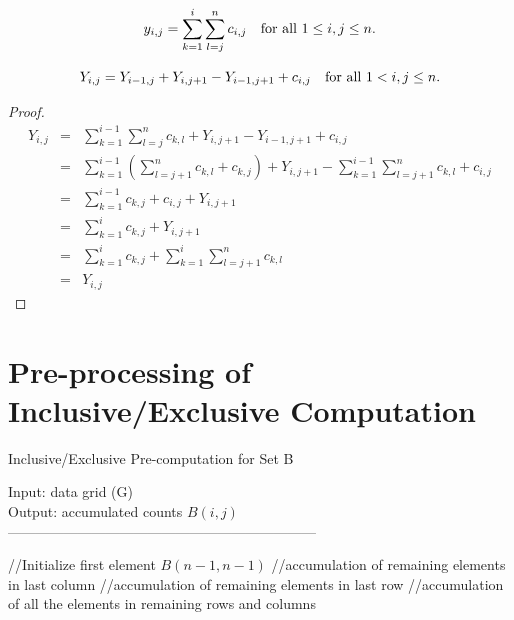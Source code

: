 \documentclass[AMA,LATO1COL]{WileyNJD-v2}
\begin{document}
\begin{definition}
\begin{equation}
y_{i,j}=\sum_{k=1}^{i}\sum_{l=j}^{n}c_{i,j}\mbox{\quad for all $1\leq i,j\leq n$}.
\end{equation}
\end{definition}

\begin{lemma}
\begin{equation}
Y_{i,j}=Y_{i-1,j}+Y_{i,j+1}-Y_{i-1,j+1}+c_{i,j} \mbox{\quad for all $1<i,j\leq n$}.
\end{equation}
\end{lemma}

\begin{proof}
\begin{eqnarray*}
Y_{i,j}& = & \sum_{k=1}^{i-1}\sum_{l=j}^{n}c_{k,l}+Y_{i,j+1}-Y_{i-1,j+1}+c_{i,j}\\
 & = & \sum_{k=1}^{i-1}\left(\sum_{l=j+1}^{n}c_{k,l}+c_{k,j}\right)+Y_{i,j+1}-\sum_{k=1}^{i-1}\sum_{l=j+1}^{n}c_{k,l}+c_{i,j}\\
 & = & \sum_{k=1}^{i-1}c_{k,j}+c_{i,j}+Y_{i,j+1}\\
 & = & \sum_{k=1}^{i}c_{k,j}+Y_{i,j+1}\\
 & = & \sum_{k=1}^{i}c_{k,j}+\sum_{k=1}^{i}\sum_{l=j+1}^{n}c_{k,l}\\
 & = & Y_{i,j}
\end{eqnarray*}
\end{proof}

\section{Pre-processing of Inclusive/Exclusive Computation}
\begin{algorithm}[t!]
\label{pre1}
\caption{Inclusive/Exclusive Pre-computation for Set B}\label{pre1}
Input: data grid (G) \\
Output: accumulated counts $B(i,j)$\\
------------------------------------------------------------------ \\
\begin{algorithmic}[1]
\State //Initialize first element $B(n-1,n-1)$
\State //accumulation of remaining elements in last column
\EndFor
\State //accumulation of remaining elements in last row
\EndFor
\State //accumulation of all the elements in remaining rows and columns
\EndFor
{}
\EndFor
\EndFor
\end{algorithmic}
\end{algorithm}
\end{document}
